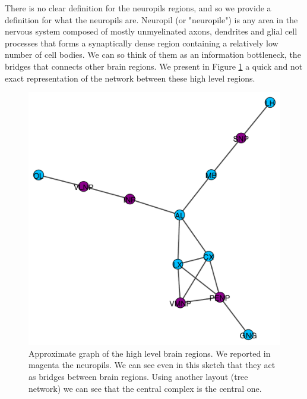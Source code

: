 There is no clear definition for the neuropils regions, and so we provide
a definition for what the neuropils are. Neuropil (or "neuropile") is any area 
in the nervous system composed of mostly unmyelinated axons, dendrites and glial 
cell processes that forms a synaptically dense region containing a relatively low 
number of cell bodies. We can so think of them as an information bottleneck, the bridges
that connects other brain regions.
We present in Figure \ref{fig:high_lvl} a quick and not exact representation of the network between these high level
regions.
\begin{figure}[h]
    \centering
    \includegraphics[width=\textwidth]{Images/high_lvl_brain.pdf}
    \caption{Approximate graph of the high level brain regions. We reported
    in magenta the neuropils. We can see even in this sketch that they act as bridges 
    between brain regions. Using another layout (tree network) we can see that the central
    complex is the central one.}
    \label{fig:high_lvl}
\end{figure}